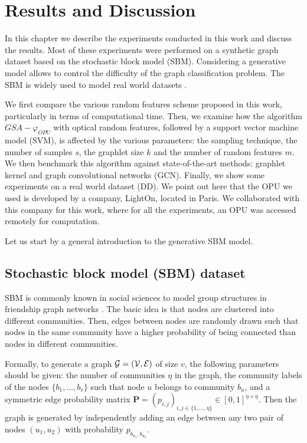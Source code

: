 \addchapheadtotoc
\chapter{Results and Discussion}
In this chapter we describe the experiments conducted in this work and discuss the results. Most of these experiments were performed on a synthetic graph dataset based on the stochastic block model (SBM). Considering a generative model allows to control the difficulty of the graph classification problem. The SBM is widely used to model real world datasets \citep{SBM}.

We first compare the various random features scheme proposed in this work, particularly in terms of computational time. Then, we examine how the algorithm $GSA-\varphi_{OPU}$ with optical random features, followed by a support vector machine model (SVM), is affected by the various parameters: the sampling technique, the number of samples $s$, the graphlet size $k$ and the number of random features $m$.
We then benchmark this algorithm against state-of-the-art methods: graphlet kernel and graph convolutional networks (GCN). %
Finally, we show some experiments on a real world dataset (DD). 
We point out here that the OPU we used is developed by a company, LightOn, located in Paris. We collaborated with this company for this work, where for all the experiments, an OPU was accessed remotely for computation.

Let us start by a general introduction to the generative SBM model.
 
\section{Stochastic block model (SBM) dataset}

SBM is commonly known in social sciences to model group structures in friendship graph networks \citep{SBM}. The basic idea is that nodes are clustered into different communities. Then, edges between nodes are randomly drawn such that nodes in the same community have a higher probability of being connected than nodes in different communities.

Formally, to generate a graph $\mathcal{G}=(\mathcal{V},\mathcal{E})$ of size $v$, the following parameters should be given: the number of communities $\eta$ in the graph, the community labels of the nodes $\{b_1 , \ldots ,b_v\}$ such that node $u$ belongs to community $b_u$, and a symmetric edge probability matrix $\mathbf{P}=(p_{i,j})_{i,j\in\{1,\ldots, \eta\}} \in [0,1]^{\eta \times \eta}$.
Then the graph is generated by independently adding an edge between any two pair of nodes $(u_1,u_2)$ with probability $p_{b_{u_1} , b_{u_2}}$.

